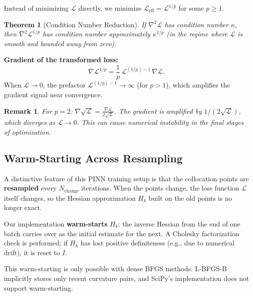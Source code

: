 \documentclass[11pt,a4paper]{article}
\newtheorem{theorem}{Theorem}[section]
\newtheorem{remark}{Remark}[section]
\newcommand{\Hk}{H_k}
\begin{document}
Instead of minimizing $\mathcal{L}$ directly, we minimize
$\mathcal{L}_{\text{eff}} = \mathcal{L}^{1/p}$ for some $p \geq 1$.

\begin{theorem}[Condition Number Reduction]
If $\nabla^2 \mathcal{L}$ has condition number $\kappa$, then
$\nabla^2 \mathcal{L}^{1/p}$ has condition number approximately
$\kappa^{1/p}$ (in the regime where $\mathcal{L}$ is smooth and bounded
away from zero).
\end{theorem}

\textbf{Gradient of the transformed loss:}
\begin{equation}
  \nabla \mathcal{L}^{1/p} = \frac{1}{p}\,\mathcal{L}^{(1/p) - 1}\,\nabla \mathcal{L}.
  \label{eq:power_grad}
\end{equation}
When $\mathcal{L} \to 0$, the prefactor $\mathcal{L}^{(1/p)-1} \to \infty$
(for $p > 1$), which amplifies the gradient signal near convergence.

\begin{remark}
For $p = 2$: $\nabla \sqrt{\mathcal{L}} = \frac{\nabla \mathcal{L}}{2\sqrt{\mathcal{L}}}$.
The gradient is amplified by $1/(2\sqrt{\mathcal{L}})$, which diverges as
$\mathcal{L} \to 0$.  This can cause numerical instability in the final
stages of optimization.
\end{remark}

\subsection{Warm-Starting Across Resampling}
\label{sec:warmstart}

A distinctive feature of this PINN training setup is that the collocation
points are \textbf{resampled} every $N_{\text{change}}$ iterations.  When
the points change, the loss function $\mathcal{L}$ itself changes, so the
Hessian approximation $\Hk$ built on the old points is no longer exact.

Our implementation \textbf{warm-starts} $\Hk$: the inverse Hessian from
the end of one batch carries over as the initial estimate for the next.
A Cholesky factorization check is performed; if $\Hk$ has lost positive
definiteness (e.g., due to numerical drift), it is reset to $I$.

This warm-starting is only possible with dense BFGS methods.  L-BFGS-B
implicitly stores only recent curvature pairs, and SciPy's
implementation does not support warm-starting.
\end{document}
